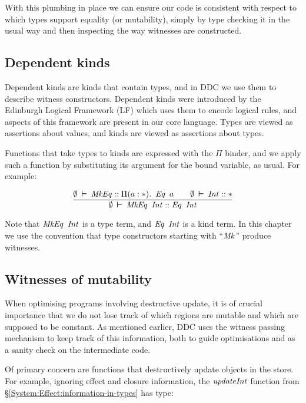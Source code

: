 With this plumbing in place we can ensure our code is consistent with respect to which types support equality (or mutability), simply by type checking it in the usual way and then inspecting the way witnesses are constructed.


\subsection{Dependent kinds}

Dependent kinds are kinds that contain types, and in DDC we use them to describe witness constructors. Dependent kinds were  introduced by the Edinburgh Logical Framework (LF) \cite{avron:edinburgh-lf} which uses them to encode logical rules, and aspects of this framework are present in our core language. Types are viewed as assertions about values, and kinds are viewed as assertions about types. 

Functions that take types to kinds are expressed with the $\Pi$ binder, and we apply such a function by substituting its argument for the bound variable, as usual. For example:

$$	\frac
		{ \emptyset \hspace{2pt} \boldsymbol{\vdash} \hspace{2pt} \operatorname{\mathit{MkEq}} :: \Pi(a : *). \ \operatorname{\mathit{Eq}} \ a 
	  	\qquad
	  	\emptyset \hspace{2pt} \boldsymbol{\vdash} \hspace{2pt} \operatorname{\mathit{Int}} :: *
		}
		{ \emptyset \hspace{2pt} \boldsymbol{\vdash} \hspace{2pt} \operatorname{\mathit{MkEq}} \ \operatorname{\mathit{Int}} :: \operatorname{\mathit{Eq}} \ \operatorname{\mathit{Int}} }
$$

Note that $\operatorname{\mathit{MkEq}} \ \operatorname{\mathit{Int}}$ is a type term, and $\operatorname{\mathit{Eq}} \ \operatorname{\mathit{Int}}$ is a kind term. In this chapter we use the convention that type constructors starting with ``$\operatorname{\mathit{Mk}}$'' produce witnesses.


\subsection{Witnesses of mutability}
\label{Core:Witnesses:mutability}
When optimising programs involving destructive update, it is of crucial importance that we do not lose track of which regions are mutable and which are supposed to be constant. As mentioned earlier, DDC uses the witness passing mechanism to keep track of this information, both to guide optimisations and as a sanity check on the intermediate code.

Of primary concern are functions that destructively update objects in the store. For example, ignoring effect and closure information, the $\operatorname{\mathit{updateInt}}$ function from \S\ref{System:Effect:information-in-types} has type:


